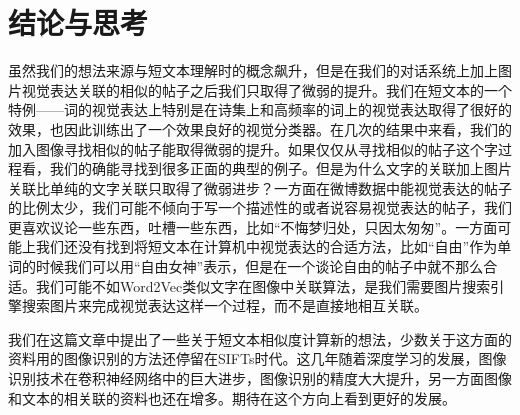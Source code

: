 \chapter{结论与思考}


虽然我们的想法来源与短文本理解时的概念飙升，但是在我们的对话系统上加上图片视觉表达关联的相似的帖子之后我们只取得了微弱的提升。我们在短文本的一个特例——词的视觉表达上特别是在诗集上和高频率的词上的视觉表达取得了很好的效果，也因此训练出了一个效果良好的视觉分类器。在几次的结果中来看，我们的加入图像寻找相似的帖子能取得微弱的提升。如果仅仅从寻找相似的帖子这个字过程看，我们的确能寻找到很多正面的典型的例子。但是为什么文字的关联加上图片关联比单纯的文字关联只取得了微弱进步？一方面在微博数据中能视觉表达的帖子的比例太少，我们可能不倾向于写一个描述性的或者说容易视觉表达的帖子，我们更喜欢议论一些东西，吐槽一些东西，比如“不悔梦归处，只因太匆匆”。一方面可能上我们还没有找到将短文本在计算机中视觉表达的合适方法，比如“自由”作为单词的时候我们可以用“自由女神”表示，但是在一个谈论自由的帖子中就不那么合适。我们可能不如Word2Vec类似文字在图像中关联算法，是我们需要图片搜索引擎搜索图片来完成视觉表达这样一个过程，而不是直接地相互关联。

我们在这篇文章中提出了一些关于短文本相似度计算新的想法，少数关于这方面的资料用的图像识别的方法还停留在SIFTs时代。\cite{bergsma2011learning}这几年随着深度学习的发展，图像识别技术在卷积神经网络中的巨大进步，图像识别的精度大大提升，另一方面图像和文本的相关联的资料也还在增多。期待在这个方向上看到更好的发展。

